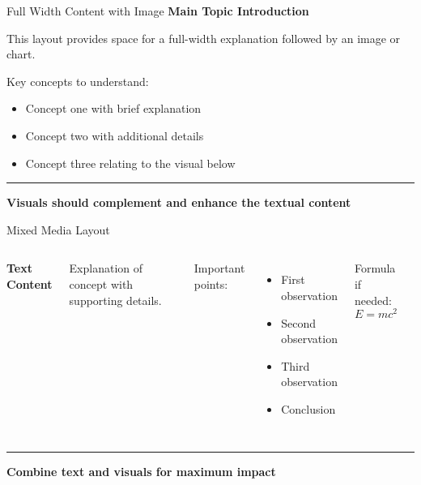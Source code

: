 \documentclass[8pt,aspectratio=169]{beamer}
\newcommand{\bottomnote}[1]{%
\vfill
\vspace{-2mm}
\textcolor{mllavender2}{\rule{\textwidth}{0.4pt}}
\vspace{1mm}
\footnotesize
\textbf{#1}
}
\begin{document}
\begin{frame}[t]{Full Width Content with Image}
\textbf{Main Topic Introduction}

This layout provides space for a full-width explanation followed by an image or chart.

Key concepts to understand:
\begin{itemize}
\item Concept one with brief explanation
\item Concept two with additional details
\item Concept three relating to the visual below
\end{itemize}

\vspace{0.5em}
\begin{center}
\framebox[0.9\textwidth][c]{
\vspace{3cm}
\textcolor{midgray}{[Image/Chart Placeholder]}
\vspace{3cm}
}
\end{center}

\bottomnote{Visuals should complement and enhance the textual content}
\end{frame}

\begin{frame}[t]{Mixed Media Layout}
\begin{columns}[T]
\textbf{Text Content}

Explanation of concept with supporting details.

Important points:
\begin{itemize}
\item First observation
\item Second observation
\item Third observation
\item Conclusion
\end{itemize}

Formula if needed:
$$E = mc^2$$

\begin{center}
\framebox[0.9\columnwidth][c]{
\vspace{4cm}
\textcolor{midgray}{[Visual Element]}
\vspace{4cm}
}
\end{center}
\end{columns}

\bottomnote{Combine text and visuals for maximum impact}
\end{frame}
\end{document}
